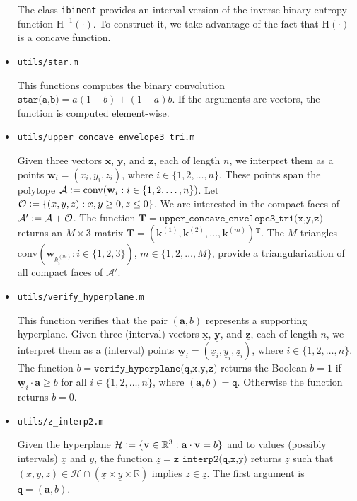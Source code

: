 \documentclass[a4paper,12pt]{scrartcl}
\newcommand{\cvx}[1]{\ensuremath{\mathrm{conv}(#1)}}
\newcommand{\ul}[1]{\ensuremath{\underline{#1}}}
\newcommand{\mat}[1]{\ensuremath{\mathbf{#1}}}
\newcommand{\vt}[1]{\ensuremath{\mathbf{#1}}}
\newcommand{\transp}{\ensuremath{^{\mathrm T}}}
\newcommand{\AAA}{\ensuremath{\mathcal A}}
\newcommand{\HHH}{\ensuremath{\mathcal H}}
\newcommand{\OOO}{\ensuremath{\mathcal O}}
\newcommand{\RR}{\ensuremath{\mathbb R}}
\newcommand{\defas}{\vcentcolon=}
\newcommand{\binEnt}[1]{\ensuremath{\mathrm{H}(#1)}}
\newcommand{\binEntInv}[1]{\ensuremath{\mathrm{H}^{-1}(#1)}}
\newcommand{\Nto}[1]{\ensuremath{\{1,2,\dots,#1\}}}
\begin{document}
\begin{itemize}
  The class \texttt{ibinent} provides an interval version of the inverse binary entropy function $\binEntInv{\cdot}$. To construct it, we take advantage of the fact that $\binEnt{\cdot}$ is a concave function.
  
  

  
\item \texttt{utils/star.m}

  This functions computes the binary convolution $\texttt{star(a,b)} = a (1-b) + (1-a) b$. If the arguments are vectors, the function is computed element-wise.
  
  
  
\item \texttt{utils/upper\_concave\_envelope3\_tri.m}

  Given three vectors $\vt x$, $\vt y$, and $\vt z$, each of length $n$, we interpret them as a points $\vt w_i = (x_i, y_i, z_i)$, where $i \in \Nto{n}$.
  These points span the polytope $\AAA \defas \cvx{\vt w_i : i \in \Nto{n}}$. Let $\OOO \defas \{(x,y,z) : x,y \ge 0, z \le 0 \}$. We are interested in the compact faces of $\AAA' \defas \AAA + \OOO$. The function $\mat T = \texttt{upper\_concave\_envelope3\_tri(x,y,z)}$ returns an $M \times 3$ matrix $\mat T = (\vt k^{(1)}, \vt k^{(2)}, \dots ,\vt k^{(m)})\transp$. The $M$ triangles $\cvx{\vt w_{k^{(m)}_i} : i \in \{1,2,3\}}$, $m \in \Nto{M}$, provide a triangularization of all compact faces of $\AAA'$.
  
  
  
\item \texttt{utils/verify\_hyperplane.m}

  This function verifies that the pair $(\vt a, b)$ represents a supporting hyperplane. Given three (interval) vectors $\ul{\vt x}$, $\ul{\vt y}$, and $\ul{\vt z}$, each of length $n$, we interpret them as a (interval) points $\ul{\vt w}_i = (\ul x_i, \ul y_i, \ul z_i)$, where $i \in \Nto{n}$. The function $b=\texttt{verify\_hyperplane(q,x,y,z)}$ returns the Boolean $b = 1$ if $\ul{\vt w}_i \cdot \vt a \ge b$ for all $i \in \Nto{n}$, where $(\vt a, b) = \texttt{q}$. Otherwise the function returns $b = 0$.

  
\item \texttt{utils/z\_interp2.m}

  Given the hyperplane $\HHH \defas \{\vt v \in \RR^3: \vt a \cdot \vt v = b\}$ and to values (possibly intervals) $\ul x$ and $\ul y$, the function $\ul z =  \texttt{z\_interp2(q,x,y)}$ returns $\ul z$ such that $(x,y,z) \in \HHH \cap ( \ul x \times \ul y \times \RR )$ implies $z \in \ul z$. The first argument is $\texttt{q} = (\vt a, b)$.
  
  
\end{itemize}
 


\printbibliography[heading=bibintoc]
\end{document}
